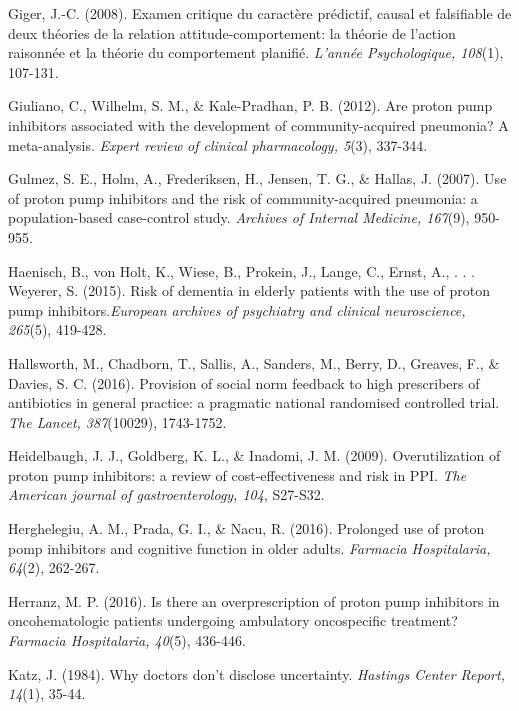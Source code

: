 \begin{thebibliography}{9}
  Giger, J.-C. (2008). Examen critique du caractère prédictif, causal et falsifiable de deux théories de la relation attitude-comportement: la théorie de l’action raisonnée et la théorie du comportement planifié. \textit{L'année Psychologique, 108}(1), 107-131. 
  
  Giuliano, C., Wilhelm, S. M., \& Kale-Pradhan, P. B. (2012). Are proton pump inhibitors associated with the development of community-acquired pneumonia? A meta-analysis.\textit{ Expert review of clinical pharmacology, 5}(3), 337-344. 
  
  Gulmez, S. E., Holm, A., Frederiksen, H., Jensen, T. G., \& Hallas, J. (2007). Use of proton pump inhibitors and the risk of community-acquired pneumonia: a population-based case-control study. \textit{Archives of Internal Medicine, 167}(9), 950-955. 
  
  Haenisch, B., von Holt, K., Wiese, B., Prokein, J., Lange, C., Ernst, A., . . . Weyerer, S. (2015). Risk of dementia in elderly patients with the use of proton pump inhibitors.\textit{European archives of psychiatry and clinical neuroscience, 265}(5), 419-428.
  
 Hallsworth, M., Chadborn, T., Sallis, A., Sanders, M., Berry, D., Greaves, F., \& Davies, S. C. (2016). Provision of social norm feedback to high prescribers of antibiotics in general practice: a pragmatic national randomised controlled trial. \textit{The Lancet, 387}(10029), 1743-1752. 
  
  Heidelbaugh, J. J., Goldberg, K. L., \& Inadomi, J. M. (2009). Overutilization of proton pump inhibitors: a review of cost-effectiveness and risk in PPI. \textit{The American journal of gastroenterology, 104}, S27-S32. 
  
  Herghelegiu, A. M., Prada, G. I., \& Nacu, R. (2016). Prolonged use of proton pomp inhibitors and cognitive function in older adults. \textit{Farmacia Hospitalaria, 64}(2), 262-267. 
  
 Herranz, M. P. (2016). Is there an overprescription of proton pump inhibitors in oncohematologic patients undergoing ambulatory oncospecific treatment? \textit{Farmacia Hospitalaria, 40}(5), 436-446. 
 
 Katz, J. (1984). Why doctors don't disclose uncertainty. \textit{Hastings Center Report, 14}(1), 35-44. 
  

\end{thebibliography}
